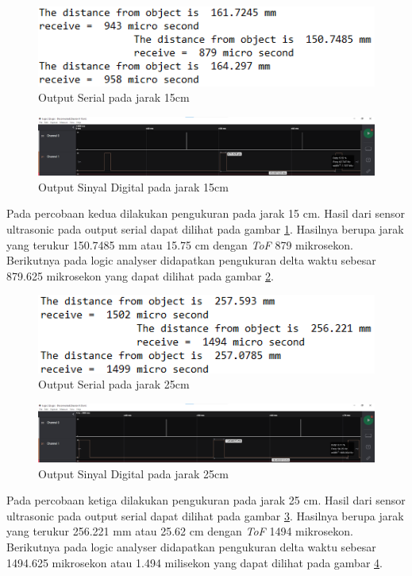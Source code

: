 \begin{figure}[h!]
	\centering
	\includegraphics[width=0.7\linewidth]{gambar/serial15cm}
	\caption{Output Serial pada jarak 15cm}
	\label{fig:serial15cm}
\end{figure}
\begin{figure}[h!]
	\centering
	\includegraphics[width=\linewidth]{gambar/logic15cm}
	\caption{Output Sinyal Digital pada jarak 15cm}
	\label{fig:logic15cm}
\end{figure}

Pada percobaan kedua dilakukan pengukuran pada jarak 15 cm. Hasil dari sensor ultrasonic pada output 
serial dapat dilihat pada gambar \ref{fig:serial15cm}. Hasilnya berupa jarak yang terukur 150.7485 mm atau 15.75 cm dengan \textit{ToF} 879 mikrosekon. Berikutnya pada logic analyser didapatkan pengukuran 
delta waktu sebesar 879.625 mikrosekon yang dapat dilihat pada gambar \ref{fig:logic15cm}.


\begin{figure}[h!]
	\centering
	\includegraphics[width=0.7\linewidth]{gambar/serial25cm}
	\caption{Output Serial pada jarak 25cm}
	\label{fig:serial25cm}
\end{figure}
\begin{figure}[h!]
	\centering
	\includegraphics[width=\linewidth]{gambar/logic25cm}
	\caption{Output Sinyal Digital pada jarak 25cm}
	\label{fig:logic25cm}
\end{figure}

Pada percobaan ketiga dilakukan pengukuran pada jarak 25 cm. Hasil dari sensor ultrasonic pada output 
serial dapat dilihat pada gambar \ref{fig:serial25cm}. Hasilnya berupa jarak yang terukur 256.221 mm atau 25.62 cm dengan \textit{ToF} 1494 mikrosekon. Berikutnya pada logic analyser didapatkan pengukuran 
delta waktu sebesar 1494.625 mikrosekon atau 1.494 milisekon yang dapat dilihat pada gambar \ref{fig:logic25cm}.


